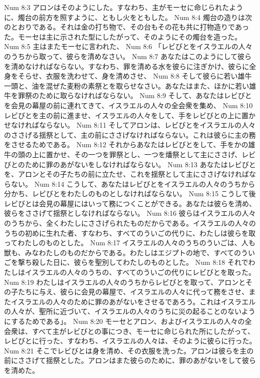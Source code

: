 Num 8:3  アロンはそのようにした。すなわち、主がモーセに命じられたように、燭台の前方を照すように、ともし火をともした。
Num 8:4  燭台の造りは次のとおりである。それは金の打ち物で、その台もその花も共に打物造りであった。モーセは主に示された型にしたがって、そのようにその燭台を造った。
Num 8:5  主はまたモーセに言われた、
Num 8:6  「レビびとをイスラエルの人々のうちから取って、彼らを清めなさい。
Num 8:7  あなたはこのようにして彼らを清めなければならない。すなわち、罪を清める水を彼らに注ぎかけ、彼らに全身をそらせ、衣服を洗わせて、身を清めさせ、
Num 8:8  そして彼らに若い雄牛一頭と、油を混ぜた麦粉の素祭とを取らせなさい。あなたはまた、ほかに若い雄牛を罪祭のために取らなければならない。
Num 8:9  そして、あなたはレビびとを会見の幕屋の前に連れてきて、イスラエルの人々の全会衆を集め、
Num 8:10  レビびとを主の前に進ませ、イスラエルの人々をして、手をレビびとの上に置かせなければならない。
Num 8:11  そしてアロンは、レビびとをイスラエルの人々のささげる揺祭として、主の前にささげなければならない。これは彼らに主の務をさせるためである。
Num 8:12  それからあなたはレビびとをして、手をかの雄牛の頭の上に置かせ、その一つを罪祭とし、一つを燔祭として主にささげ、レビびとのために罪のあがないをしなければならない。
Num 8:13  あなたはレビびとを、アロンとその子たちの前に立たせ、これを揺祭として主にささげなければならない。
Num 8:14  こうして、あなたはレビびとをイスラエルの人々のうちから分かち、レビびとをわたしのものとしなければならない。
Num 8:15  こうして後レビびとは会見の幕屋にはいって務につくことができる。あなたは彼らを清め、彼らをささげて揺祭としなければならない。
Num 8:16  彼らはイスラエルの人々のうちから、全くわたしにささげられたものだからである。イスラエルの人々のうちの初めに生れた者、すなわち、すべてのういごの代りに、わたしは彼らを取ってわたしのものとした。
Num 8:17  イスラエルの人々のうちのういごは、人も獣も、みなわたしのものだからである。わたしはエジプトの地で、すべてのういごを撃ち殺した日に、彼らを聖別してわたしのものとした。
Num 8:18  それでわたしはイスラエルの人々のうちの、すべてのういごの代りにレビびとを取った。
Num 8:19  わたしはイスラエルの人々のうちからレビびとを取って、アロンとその子たちに与え、彼らに会見の幕屋で、イスラエルの人々に代って務をさせ、またイスラエルの人々のために罪のあがないをさせるであろう。これはイスラエルの人々が、聖所に近づいて、イスラエルの人々のうちに災の起ることのないようにするためである」。
Num 8:20  モーセとアロン、およびイスラエルの人々の全会衆は、すべて主がレビびとの事につき、モーセに命じられた所にしたがって、レビびとに行った、すなわち、イスラエルの人々は、そのように彼らに行った。
Num 8:21  そこでレビびとは身を清め、その衣服を洗った。アロンは彼らを主の前にささげて揺祭とした。アロンはまた彼らのために、罪のあがないをして彼らを清めた。
